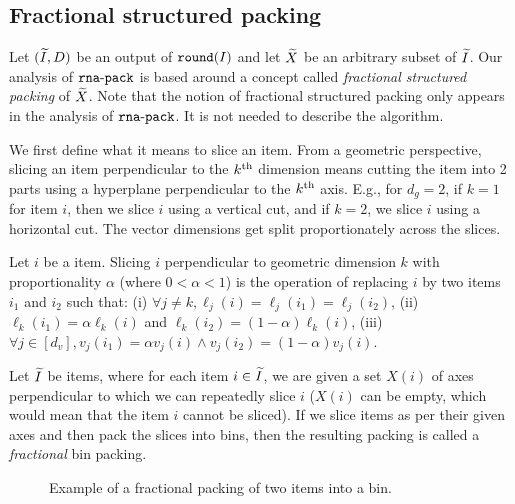 \subsection{Fractional structured packing}
\label{sec:rna:frac-pack}

Let $(\widetilde{I}, D)$ be an output of $\operatorname{\mathtt{round}}(I)$ and let $\widetilde{X}$
be an arbitrary subset of $\widetilde{I}$.
Our analysis of $\operatorname{\mathtt{rna-pack}}$ is based around a concept called
\emph{fractional structured packing} of $\widetilde{X}$.
Note that the notion of fractional structured packing only appears in the
analysis of $\operatorname{\mathtt{rna-pack}}$. It is not needed to describe the algorithm.

We first define what it means to slice an item.
From a geometric perspective, slicing an item perpendicular to the $k^{\textrm{th}}$ dimension
means cutting the item into 2 parts using a hyperplane perpendicular to the $k^{\textrm{th}}$ axis.
E.g., for $d_g=2$, if $k=1$ for item $i$, then we slice $i$ using a vertical cut,
and if $k=2$, we slice $i$ using a horizontal cut.
The vector dimensions get split proportionately across the slices.

\begin{definition}
Let $i$ be a  item.
Slicing $i$ perpendicular to geometric dimension $k$
with proportionality $\alpha$ (where $0 < \alpha < 1$)
is the operation of replacing $i$ by two items $i_1$ and $i_2$ such that:
(i) $\forall j \neq k, \ell_j(i) = \ell_j(i_1) = \ell_j(i_2)$,
(ii) $\ell_k(i_1) = \alpha \ell_k(i)$ and $\ell_k(i_2) = (1-\alpha)\ell_k(i)$,
(iii) $\forall j \in [d_v], v_j(i_1) = \alpha v_j(i) \wedge v_j(i_2) = (1-\alpha) v_j(i)$.
\end{definition}

\begin{definition}
Let $\widetilde{I}$ be  items, where for each item $i \in \widetilde{I}$,
we are given a set $X(i)$ of axes perpendicular to which we can repeatedly slice $i$
($X(i)$ can be empty, which would mean that the item $i$ cannot be sliced).
If we slice items as per their given axes and then pack the slices into bins,
then the resulting packing is called a \emph{fractional} bin packing.
\end{definition}

\begin{figure}[htb]
\centering

\caption{Example of a fractional packing of two items into a bin.}
\label{fig:frac-pack}
\end{figure}

